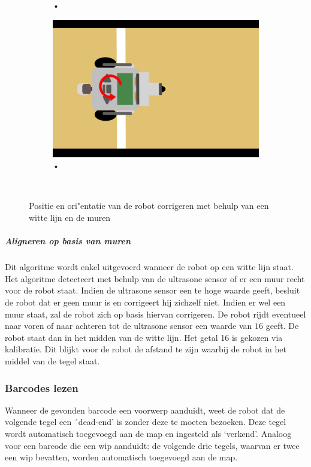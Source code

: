 \documentclass[tt3]{penoverslag}
\begin{document}
\begin{figure}
\begin{subfigure}[h]{0.24\textwidth}
		\caption{•}
		\label{fig:AlgoWit6}
	\end{subfigure}
	\begin{subfigure}[h]{0.24\textwidth}
		\includegraphics[width=\textwidth]{WitteLijn7}
		\caption{•}
		\label{fig:AlgoWit7}
	\end{subfigure}\\
	\caption{Positie en ori"entatie van de robot corrigeren met behulp van een witte lijn en de muren}
	\label{fig:AlgoWit}
\end{figure}

\subparagraph{Aligneren op basis van muren}
Dit algoritme wordt enkel uitgevoerd wanneer de robot op een witte lijn staat. Het algoritme detecteert met behulp van de ultrasone sensor of er een muur recht voor de robot staat. Indien de ultrasone sensor een te hoge waarde geeft, besluit de robot dat er geen muur is en corrigeert hij zichzelf niet. Indien er wel een muur staat, zal de robot zich op basis hiervan corrigeren. De robot rijdt eventueel naar voren of naar achteren tot de ultrasone sensor een waarde van $16$ geeft. De robot staat dan in het midden van de witte lijn. Het getal 16 is gekozen via kalibratie. Dit blijkt voor de robot de afstand te zijn waarbij de robot in het middel van de tegel staat. 

\subsubsection{Barcodes lezen}
\label{ssec:AlgoBar}

Wanneer de gevonden barcode een voorwerp aanduidt, weet de robot dat de volgende tegel een ´dead-end' is zonder deze te moeten bezoeken. Deze tegel wordt automatisch toegevoegd aan de map en ingesteld als `verkend'.
Analoog voor een barcode die een wip aanduidt: de volgende drie tegels, waarvan er twee een wip bevatten, worden automatisch toegevoegd aan de map.
\end{document}
